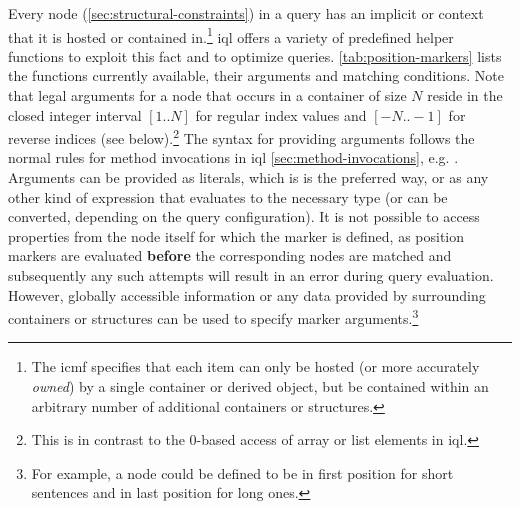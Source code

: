 \documentclass[11pt,a4paper]{report}
\begin{document}
Every node (\ref{sec:structural-constraints}) in a query has an implicit  or  context that it is hosted  or contained in.\footnote{The \ac{icmf} specifies that each item can only be hosted (or more accurately \textit{owned}) by a single container or derived object, but be contained within an arbitrary number of additional containers or structures.}
\ac{iql} offers a variety of predefined helper functions  to exploit this fact and to optimize queries.
\cref{tab:position-markers} lists the functions currently available, their arguments and matching conditions.
Note that legal arguments for a node that occurs in a container of size $N$ reside in the closed integer interval $[1..N]$ for regular index values and $[-N..-1]$ for reverse indices (see below).\footnote{This is in contrast to the 0-based access of array or list elements in \ac{iql}.}
The syntax for providing arguments follows the normal rules for method invocations in \ac{iql} \ref{sec:method-invocations}, e.g. .
Arguments can be provided as literals, which is is the preferred way, or as any other kind of expression that evaluates to the necessary type (or can be converted, depending on the query configuration).
It is not possible to access properties from the node itself for which the marker is defined, as position markers are evaluated \textbf{before} the corresponding nodes are matched and subsequently any such attempts will result in an error during query evaluation.
However, globally accessible information or any data provided by surrounding containers or structures can be used to specify marker arguments.\footnote{For example, a node could be defined to be in first position for short sentences and in last position for long ones.}
\end{document}
